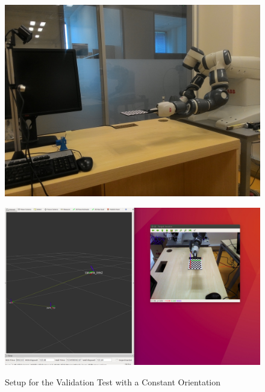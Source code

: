 \begin{figure}[htp]
\begin{center}
{
  \includegraphics[clip,width=0.5\columnwidth]{images/ext1.jpg}
}
\end{center}
\begin{center}
{
  \includegraphics[clip,width=0.5\columnwidth]{images/ext2.jpg}
}
\end{center}
\caption{Setup for the Validation Test with a Constant Orientation}
\label{setupext}
\end{figure}


